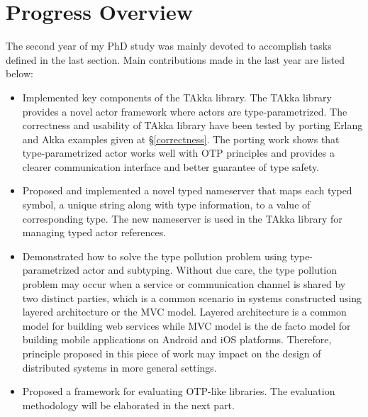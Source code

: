 \section{Progress Overview}
The second year of my PhD study was mainly devoted to accomplish tasks defined in the last section.  Main contributions made in the last year are listed below:

\begin{itemize}
\item Implemented key components of the TAkka library.  The TAkka library provides a novel actor framework where actors are type-parametrized.  The correctness and usability of TAkka library have been tested by porting Erlang and Akka examples given at \S\ref{correctness}.  The porting work shows that type-parametrized actor works well with OTP principles and provides a clearer communication interface and better guarantee of type safety.

\item Proposed and implemented a novel typed nameserver that maps each typed symbol, a unique string along with type information, to a value of corresponding type.  The new nameserver is used in the TAkka library for managing typed actor references.

\item Demonstrated how to solve the type pollution problem using type-parametrized actor and subtyping.  Without due care, the type pollution problem may occur when a service or communication channel is shared by two distinct parties, which is a common scenario in systems constructed using layered architecture or the MVC model.  Layered architecture is a common model for building web services while MVC model is the de facto model for building mobile applications on Android and iOS platforms.  Therefore, principle proposed in this piece of work may impact on the design of distributed systems in more general settings.

\item Proposed a framework for evaluating OTP-like libraries.  The evaluation methodology will be elaborated in the next part.
\end{itemize}

